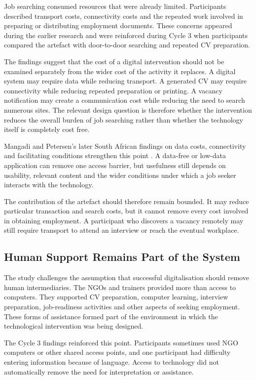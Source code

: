 Job searching consumed resources that were already limited. Participants described transport costs, connectivity costs and the repeated work involved in preparing or distributing employment documents. These concerns appeared during the earlier research and were reinforced during Cycle 3 when participants compared the artefact with door-to-door searching and repeated CV preparation.

The findings suggest that the cost of a digital intervention should not be examined separately from the wider cost of the activity it replaces. A digital system may require data while reducing transport. A generated CV may require connectivity while reducing repeated preparation or printing. A vacancy notification may create a communication cost while reducing the need to search numerous sites. The relevant design question is therefore whether the intervention reduces the overall burden of job searching rather than whether the technology itself is completely cost free.

Mangadi and Petersen's later South African findings on data costs, connectivity and facilitating conditions strengthen this point \cite{mangadi2024}. A data-free or low-data application can remove one access barrier, but usefulness still depends on usability, relevant content and the wider conditions under which a job seeker interacts with the technology.

The contribution of the artefact should therefore remain bounded. It may reduce particular transaction and search costs, but it cannot remove every cost involved in obtaining employment. A participant who discovers a vacancy remotely may still require transport to attend an interview or reach the eventual workplace.


\subsection{Human Support Remains Part of the System}
\label{sec:human-support}

The study challenges the assumption that successful digitalisation should remove human intermediaries. The NGOs and trainers provided more than access to computers. They supported CV preparation, computer learning, interview preparation, job-readiness activities and other aspects of seeking employment. These forms of assistance formed part of the environment in which the technological intervention was being designed.

The Cycle 3 findings reinforced this point. Participants sometimes used NGO computers or other shared access points, and one participant had difficulty entering information because of language. Access to technology did not automatically remove the need for interpretation or assistance.


